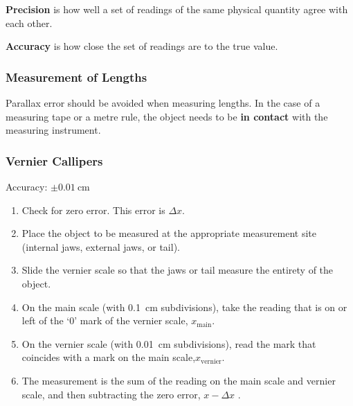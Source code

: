 \documentclass[../main.tex]{subfiles}
\begin{document}
		\textbf{Precision} is how well a set of readings of the same physical quantity agree with each other.
		
		\textbf{Accuracy} is how close the set of readings are to the true value.
		
		\subsubsection{Measurement of Lengths}
		Parallax error should be avoided when measuring lengths. In the case of a measuring tape or a metre rule, the object needs to be \textbf{in contact} with the measuring instrument.
		
		\subsubsection*{Vernier Callipers}
		Accuracy: \(\pm \SI{0.01}{\centi\meter}\)
		\begin{enumerate}
			\item Check for zero error. This error is \(\Delta x\).
			\item Place the object to be measured at the appropriate measurement site (internal jaws, external jaws, or tail).
			\item Slide the vernier scale so that the jaws or tail measure the entirety of the object.
			\item On the main scale (with \SI{0.1}{\centi\meter} subdivisions), take the reading that is on or left of the `0' mark of the vernier scale, \(x_\mathrm{main}\).
			\item On the vernier scale (with \SI{0.01}{\centi\meter} subdivisions), read the mark that coincides with a mark on the main scale,\(x_\mathrm{vernier}\).
			\item The measurement is the sum of the reading on the main scale and vernier scale, and then subtracting the zero error, \(x-\Delta x\) .
		\end{enumerate}
	
\end{document}
